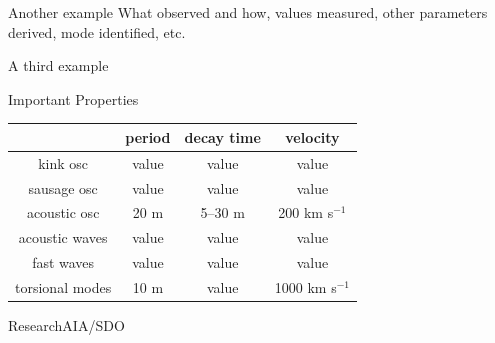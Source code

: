 \documentclass[table]{beamer}
\begin{document}
\begin{frame}{Another example}
    What observed and how, values measured, other parameters derived,
    mode identified, etc.
\end{frame}%
\begin{frame}{A third example}
\end{frame}%
\begin{frame}{Important Properties}
\begin{center}
    \begin{tabular}{c|c|c|c|}
    \cline{2-4} & {\textbf{period}} &
        {\textbf{decay time}} &
        {\textbf{velocity}}\\
    \hline \multicolumn{0}{|c|}{kink osc} & value & value & value\\
    \hline \multicolumn{0}{|c|}{sausage osc} & value & value & value\\
    \hline \multicolumn{0}{|c|}{acoustic osc} & 20 m & 5--30 m & 200 km s$^{-1}$\\
    \hline \multicolumn{0}{|c|}{acoustic waves} & value & value & value\\
    \hline \multicolumn{0}{|c|}{fast waves} & value & value & value\\
    \hline \multicolumn{0}{|c|}{torsional modes} & 10 m & value &
        1000 km s$^{-1}$\\
    \hline
    \end{tabular}
\end{center}
\end{frame}%
{%
\begin{frame}{Research}{AIA/SDO}
\end{frame}}%

\end{document}

